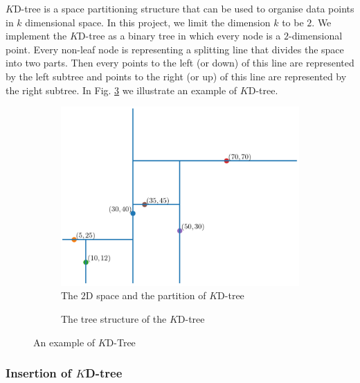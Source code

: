 $K$D-tree is a space partitioning structure that can be used to organise data points in $k$ dimensional space. In this project, we limit the dimension $k$ to be $2$. We implement the $K$D-tree as a binary tree in which every node is a $2$-dimensional point. Every non-leaf node is representing a splitting line that divides the space into two parts. Then every points to the left (or down) of this line are represented by the left subtree and points to the right (or up) of this line are represented by the right subtree. In Fig. \ref{fig:kd_tree_example} we illustrate an example of $K$D-tree.

\begin{figure}
     \centering
     \begin{subfigure}[b]{0.58\textwidth}
         \centering
         \includegraphics[width=\textwidth]{graphs/implementation/2d/kdtree_partition}
         \caption{The $2$D space and the partition of $K$D-tree}
         \label{fig:y equals x}
     \end{subfigure}
     \hfill
     \begin{subfigure}[b]{0.40\textwidth}
         \centering
         
         \caption{The tree structure of the $K$D-tree}
         \label{fig:three sin x}
     \end{subfigure}
        \caption{An example of $K$D-Tree}
        \label{fig:kd_tree_example}
\end{figure}

\subsubsection{Insertion of $K$D-tree}

